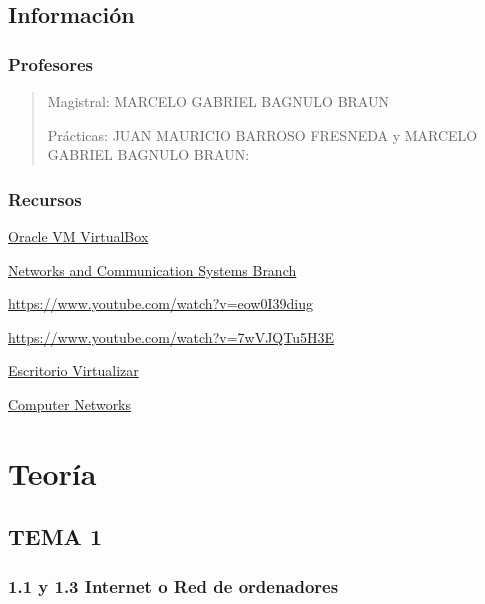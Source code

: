 \documentclass[12pt, twoside, openright]{report} %
\begin{document}
\listoffigures
\thispagestyle{fancy}





\chapter{Información}
\section{Profesores}
\begin{quote}
Magistral: MARCELO GABRIEL BAGNULO BRAUN 

Prácticas: JUAN MAURICIO BARROSO FRESNEDA y MARCELO GABRIEL BAGNULO BRAUN:
\end{quote}

\section{Recursos}

\href{https://www.virtualbox.org/}{Oracle VM VirtualBox}

\href{https://www.nrl.navy.mil/itd/ncs/products/core}{Networks and
Communication Systems Branch}

\url{https://www.youtube.com/watch?v=eow0I39diug}

\url{https://www.youtube.com/watch?v=7wVJQTu5H3E}

\href{http://www.ingebook.com/ib/NPcd/IB_Escritorio_Visualizar?cod_primaria=1000193\&libro=6752}{Escritorio Virtualizar}

\href{https://padlet.com/fvalera/8njxmoxyj4qgck6d}{Computer Networks}


\part{Teoría}
\chapter{TEMA 1}

\section{1.1 y 1.3 Internet o Red de ordenadores}
\end{document}
